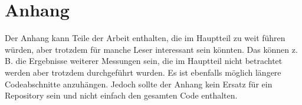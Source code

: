 \chapter{Anhang}
Der Anhang kann Teile der Arbeit enthalten, die im Hauptteil zu weit führen würden, aber trotzdem für manche Leser interessant sein könnten. Das können z.\,B. die Ergebnisse weiterer Messungen sein, die im Hauptteil nicht betrachtet werden aber trotzdem durchgeführt wurden. Es ist ebenfalls möglich längere Codeabschnitte anzuhängen. Jedoch sollte der Anhang kein Ersatz für ein Repository sein und nicht einfach den gesamten Code enthalten.